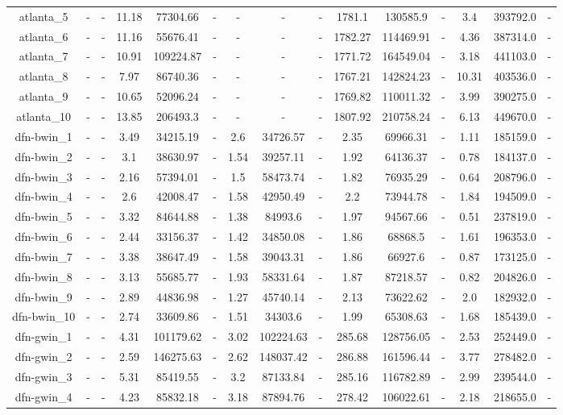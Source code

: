 \documentclass[main.tex]{subfiles}
\begin{document}
\begin{landscape}
\begin{table}[h]
\begin{tabular}{c|cc|ccc|ccc|ccc|ccc}
	atlanta\_5 &- &- &11.18 &77304.66 &- &- &- &- &1781.1 &130585.9 &- &3.4 &393792.0 &-\\
	atlanta\_6 &- &- &11.16 &55676.41 &- &- &- &- &1782.27 &114469.91 &- &4.36 &387314.0 &-\\
	atlanta\_7 &- &- &10.91 &109224.87 &- &- &- &- &1771.72 &164549.04 &- &3.18 &441103.0 &-\\
	atlanta\_8 &- &- &7.97 &86740.36 &- &- &- &- &1767.21 &142824.23 &- &10.31 &403536.0 &-\\
	atlanta\_9 &- &- &10.65 &52096.24 &- &- &- &- &1769.82 &110011.32 &- &3.99 &390275.0 &-\\
	atlanta\_10 &- &- &13.85 &206493.3 &- &- &- &- &1807.92 &210758.24 &- &6.13 &449670.0 &-\\
	dfn-bwin\_1 &- &- &3.49 &34215.19 &- &2.6 &34726.57 &- &2.35 &69966.31 &- &1.11 &185159.0 &-\\
	dfn-bwin\_2 &- &- &3.1 &38630.97 &- &1.54 &39257.11 &- &1.92 &64136.37 &- &0.78 &184137.0 &-\\
	dfn-bwin\_3 &- &- &2.16 &57394.01 &- &1.5 &58473.74 &- &1.82 &76935.29 &- &0.64 &208796.0 &-\\
	dfn-bwin\_4 &- &- &2.6 &42008.47 &- &1.58 &42950.49 &- &2.2 &73944.78 &- &1.84 &194509.0 &-\\
	dfn-bwin\_5 &- &- &3.32 &84644.88 &- &1.38 &84993.6 &- &1.97 &94567.66 &- &0.51 &237819.0 &-\\
	dfn-bwin\_6 &- &- &2.44 &33156.37 &- &1.42 &34850.08 &- &1.86 &68868.5 &- &1.61 &196353.0 &-\\
	dfn-bwin\_7 &- &- &3.38 &38647.49 &- &1.58 &39043.31 &- &1.86 &66927.6 &- &0.87 &173125.0 &-\\
	dfn-bwin\_8 &- &- &3.13 &55685.77 &- &1.93 &58331.64 &- &1.87 &87218.57 &- &0.82 &204826.0 &-\\
	dfn-bwin\_9 &- &- &2.89 &44836.98 &- &1.27 &45740.14 &- &2.13 &73622.62 &- &2.0 &182932.0 &-\\
	dfn-bwin\_10 &- &- &2.74 &33609.86 &- &1.51 &34303.6 &- &1.99 &65308.63 &- &1.68 &185439.0 &-\\
	dfn-gwin\_1 &- &- &4.31 &101179.62 &- &3.02 &102224.63 &- &285.68 &128756.05 &- &2.53 &252449.0 &-\\
	dfn-gwin\_2 &- &- &2.59 &146275.63 &- &2.62 &148037.42 &- &286.88 &161596.44 &- &3.77 &278482.0 &-\\
	dfn-gwin\_3 &- &- &5.31 &85419.55 &- &3.2 &87133.84 &- &285.16 &116782.89 &- &2.99 &239544.0 &-\\
	dfn-gwin\_4 &- &- &4.23 &85832.18 &- &3.18 &87894.76 &- &278.42 &106022.61 &- &2.18 &218655.0 &-\\

\end{tabular}
\end{table}
\end{landscape}
\end{document}
